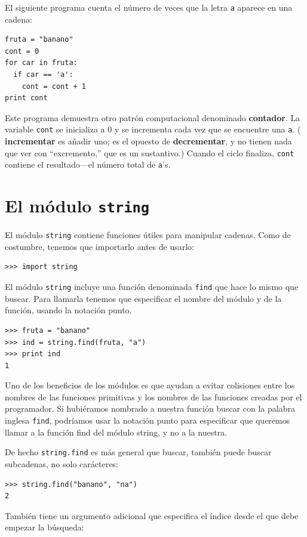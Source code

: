 El siguiente programa cuenta el número de veces que la letra
 \texttt{a} aparece en una cadena:

\beforeverb
\begin{verbatim}
fruta = "banano"
cont = 0
for car in fruta:
  if car == 'a':
    cont = cont + 1
print cont
\end{verbatim}
\afterverb
%
Este programa demuestra otro patrón computacional denominado
 {\bf contador}.  La variable \texttt{cont} se inicializa a 0 
y se incrementa cada vez que se encuentre una  \texttt{a}. 
 ( {\bf incrementar} es añadir uno; es el opuesto de
 {\bf decrementar}, y no tienen nada que ver con  ``excremento,'' que
es un sustantivo.)  Cuando el ciclo finaliza, \texttt{cont}
contiene el resultado---el número total de \texttt{a}'s.



\section{El módulo \texttt{string} }

El módulo  \texttt{string} contiene funciones útiles para manipular
cadenas.  Como de costumbre, tenemos que importarlo antes de
usarlo:

\beforeverb
\begin{verbatim}
>>> import string
\end{verbatim}
\afterverb
%
El módulo  \texttt{string} incluye una función denominada \texttt{find} que
hace lo mismo que buscar.  Para llamarla tenemos que
especificar el nombre del módulo y de la función, usando
la notación punto.

\beforeverb
\begin{verbatim}
>>> fruta = "banano"
>>> ind = string.find(fruta, "a")
>>> print ind
1
\end{verbatim}
\afterverb
%
Uno de los beneficios de los módulos es que ayudan a 
evitar colisiones entre los nombres de las funciones primitivas y 
los nombres de las funciones creadas por el programador. Si hubiéramos
nombrado a nuestra función buscar con la palabra inglesa \texttt{find},
podríamos usar la notación punto para especificar que queremos 
llamar a la función find del módulo string, y no a la nuestra.

De hecho  \texttt{string.find} es más general que buscar, también puede buscar
subcadenas, no solo carácteres:

\beforeverb
\begin{verbatim}
>>> string.find("banano", "na")
2
\end{verbatim}
\afterverb
%
También tiene un argumento adicional que especifica el índice desde
el que debe empezar la búsqueda:

